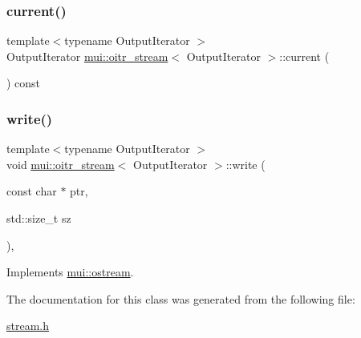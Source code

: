 \subsubsection{\texorpdfstring{current()}{current()}}
{\footnotesize\ttfamily template$<$typename Output\+Iterator $>$ \\
Output\+Iterator \hyperlink{classmui_1_1oitr__stream}{mui\+::oitr\+\_\+stream}$<$ Output\+Iterator $>$\+::current (\begin{DoxyParamCaption}{ }\end{DoxyParamCaption}) const\hspace{0.3cm}{\ttfamily [inline]}}

\mbox{\label{classmui_1_1oitr__stream_aa726d0d57ba12ede019d019d382eb4cf}} 
\subsubsection{\texorpdfstring{write()}{write()}}
{\footnotesize\ttfamily template$<$typename Output\+Iterator $>$ \\
void \hyperlink{classmui_1_1oitr__stream}{mui\+::oitr\+\_\+stream}$<$ Output\+Iterator $>$\+::write (\begin{DoxyParamCaption}\item[{const char $\ast$}]{ptr,  }\item[{std\+::size\+\_\+t}]{sz }\end{DoxyParamCaption})\hspace{0.3cm}{\ttfamily [inline]}, {\ttfamily [virtual]}}



Implements \hyperlink{classmui_1_1ostream_a93a0a1d32007efc375d885181c833995}{mui\+::ostream}.



The documentation for this class was generated from the following file\+:\begin{DoxyCompactItemize}
\item 
\hyperlink{stream_8h}{stream.\+h}\end{DoxyCompactItemize}
